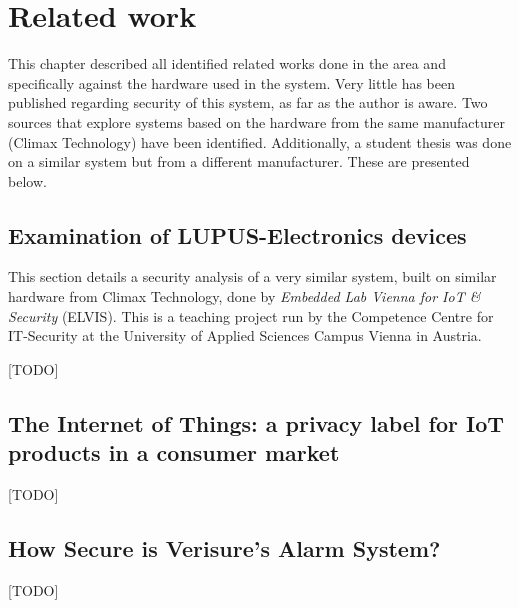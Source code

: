 \chapter{Related work} \label{ch:related-work}
This chapter described all identified related works done in the area and specifically against the hardware used in the system. Very little has been published regarding security of this system, as far as the author is aware. Two sources that explore systems based on the hardware from the same manufacturer (Climax Technology) have been identified. Additionally, a student thesis was done on a similar system but from a different manufacturer. These are presented below.

\section{Examination of LUPUS-Electronics devices}
This section details a security analysis of a very similar system, built on similar hardware from Climax Technology, done by \textit{Embedded Lab Vienna for IoT \& Security} (ELVIS). This is a teaching project run by the Competence Centre for IT-Security at the University of Applied Sciences Campus Vienna in Austria.

[TODO] \cite{labvienna}

\section{The Internet of Things: a privacy label for IoT products in a consumer market}
[TODO] \cite{iotprivacylabel}

\section{How Secure is Verisure’s Alarm System?}
[TODO] \cite{verisurethesis}